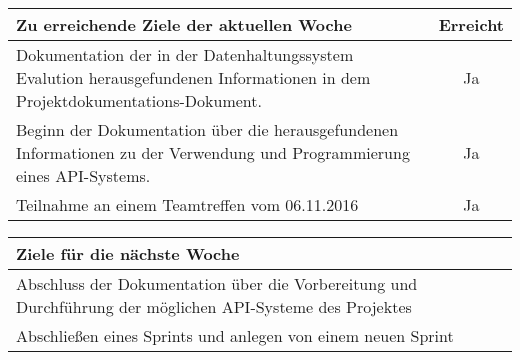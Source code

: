 \begin{tabularx}{\textwidth}{Xc}
    \arrayrulecolor{OliveGreen}
    \toprule
    {\bfseries Zu erreichende Ziele der aktuellen Woche} & {\bfseries Erreicht} \\
    \midrule[2pt]
    Dokumentation der in der Datenhaltungssystem Evalution
    herausgefundenen Informationen in dem 
    Projektdokumentations-Dokument.  &  Ja  \\
    \rowcolor{OliveGreen!15}
    Beginn der Dokumentation über die herausgefundenen Informationen
    zu der Verwendung und Programmierung eines API-Systems.  &  Ja \\
    \rowcolor{White}
    Teilnahme an einem Teamtreffen vom 06.11.2016  &  Ja \\
    \bottomrule[2pt]
\end{tabularx}
%
\vspace{1cm}
%
\begin{tabularx}{\textwidth}{Xc}
    \arrayrulecolor{OliveGreen}
    \toprule
    {\bfseries Ziele für die nächste Woche}              &                   \\
    \midrule[2pt]
    Abschluss der Dokumentation über die Vorbereitung und Durchführung der
    möglichen API-Systeme des Projektes  & \\
    \rowcolor{OliveGreen!15}
    Abschließen eines Sprints und anlegen von einem neuen Sprint  &  \\
    \midrule[2pt]
\end{tabularx}
